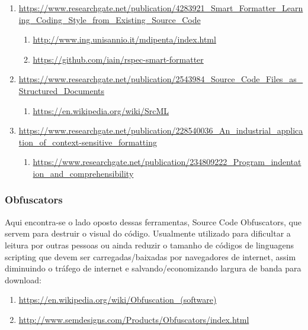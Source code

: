 {\begin{sloppypar}
\begin{myquote}
\begin{enumerate}[leftmargin=*,parsep=0pt]
    \item \url{https://www.researchgate.net/publication/4283921_Smart_Formatter_Learning_Coding_Style_from_Existing_Source_Code}
    \begin{enumerate}[nolistsep,topsep=0pt,label=$\star$]
        \item \url{http://www.ing.unisannio.it/mdipenta/index.html}
        \item \url{https://github.com/iain/rspec-smart-formatter}
    \end{enumerate}

    \item \url{https://www.researchgate.net/publication/2543984_Source_Code_Files_as_Structured_Documents}
    \begin{enumerate}[nolistsep,topsep=0pt,label=$\star$]
        \item \url{https://en.wikipedia.org/wiki/SrcML}
    \end{enumerate}

    \item \url{https://www.researchgate.net/publication/228540036_An_industrial_application_of_context-sensitive_formatting}
    \begin{enumerate}[nolistsep,topsep=0pt,label=$\star$]
        \item \url{https://www.researchgate.net/publication/234809222_Program_indentation_and_comprehensibility}
    \end{enumerate}

    \end{enumerate}
    \end{myquote}
    \end{sloppypar}


\subsubsection{Obfuscators}

    Aqui encontra-se o lado oposto dessas ferramentas, Source Code Obfuscators, que servem para
    destruir o visual do código. Usualmente utilizado para dificultar a leitura por outras pessoas
    ou ainda reduzir o tamanho de códigos de linguagens scripting que devem ser carregadas/baixadas
    por navegadores de internet, assim diminuindo o tráfego de internet e salvando/economizando
    largura de banda para download:

    \begin{sloppypar}
    \begin{myquote}\RaggedRight
    \begin{enumerate}[leftmargin=*,parsep=0pt]

    \item \url{https://en.wikipedia.org/wiki/Obfuscation_(software)}

    \item \url{http://www.semdesigns.com/Products/Obfuscators/index.html}

    \end{enumerate}
    \end{myquote}
    \end{sloppypar}


}
{
    
}


